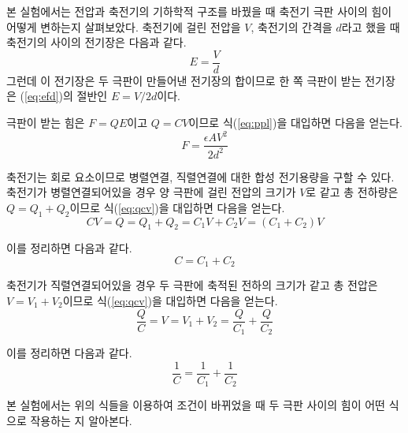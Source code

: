 \documentclass[a4paper]{article}
\begin{document}
\newpage
	본 실험에서는 전압과 축전기의 기하학적 구조를 바꿨을 때 축전기 극판 사이의 힘이 어떻게 변하는지 살펴보았다. 축전기에 걸린 전압을 $V$, 축전기의 간격을 $d$라고 했을 때 축전기의 사이의 전기장은 다음과 같다.
		\begin{equation} \label{eq:efd}
			E=\frac{V}{d}
		\end{equation}
	그런데 이 전기장은 두 극판이 만들어낸 전기장의 합이므로 한 쪽 극판이 받는 전기장은 (\ref{eq:efd})의 절반인 $E=V/{2d}$이다.

	극판이 받는 힘은 $F=QE$이고 $Q=CV$이므로 식(\ref{eq:ppl})을 대입하면 다음을 얻는다. 
		\begin{equation} \label{eq:force}
			F=\frac{\epsilon{}AV^{2}}{2d^{2}}
		\end{equation}


	축전기는 회로 요소이므로 병렬연결, 직렬연결에 대한 합성 전기용량을 구할 수 있다.
	축전기가 병렬연결되어있을 경우 양 극판에 걸린 전압의 크기가 $V$로 같고 총 전하량은 $Q=Q_1+Q_2$이므로 식(\ref{eq:qcv})을 대입하면 다음을 얻는다. 
		\begin{equation}
			CV=Q=Q_{1}+Q_{2}=C_{1}V+C_{2}V=(C_{1}+C_{2})V 
		\end{equation}

	이를 정리하면 다음과 같다.
		\begin{equation}
			C=C_{1}+C_{2}
		\end{equation}
	
	축전기가 직렬연결되어있을 경우 두 극판에 축적된 전하의 크기가 같고 총 전압은 $V=V_1+V_2$이므로 식(\ref{eq:qcv})을 대입하면 다음을 얻는다.
		\begin{equation}
			\frac{Q}{C}=V=V_{1}+V_{2}=\frac{Q}{C_1}+\frac{Q}{C_2}
		\end{equation}

	이를 정리하면 다음과 같다.
		\begin{equation}
			\frac{1}{C}=\frac{1}{C_1}+\frac{1}{C_2}
		\end{equation} 


	본 실험에서는 위의 식들을 이용하여 조건이 바뀌었을 때 두 극판 사이의 힘이 어떤 식으로 작용하는 지 알아본다. 

\newpage
\end{document}
